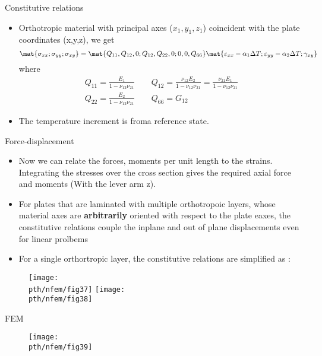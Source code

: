	\begin{frame}{Constitutive relations}
		\begin{itemize}
			\item Orthotropic material with principal axes ($x_1,y_1,z_1$) coincident with the plate coordinates (x,y,z), we get
			\begin{equation}
			\mat{\sigma_{xx};\sigma_{yy};\sigma_{xy}} = \mat{Q_{11},Q_{12},0;Q_{12},Q_{22},0;0,0,Q_{66}}
			\mat{\varepsilon_{xx} - \alpha_1\Delta T;\varepsilon_{yy} - \alpha_2\Delta T;\gamma_{xy}}
			\end{equation}
			where 
			\begin{equation}
			\begin{aligned}
			Q_{11} =  \frac{E_1}{1-\nu_{12}\nu_{21}} \qquad Q_{12} =  \frac{\nu_{12} E_2}{1-\nu_{12}\nu_{21}} = \frac{\nu_{21} E_1}{1-\nu_{12}\nu_{21}} \\
			Q_{22} = \frac{E_2}{1-\nu_{12}\nu_{21}} \qquad Q_{66} = G_{12}
			\end{aligned}
			\end{equation}
			\item The temperature increment is froma reference state.
		\end{itemize}
	\end{frame}


	\begin{frame}{Force-displacement}
		\begin{itemize}
			\item Now we can relate the forces, moments per unit length to the strains. Integrating the stresses over the cross section gives the required axial force and moments (With the lever arm z). 
			\item For plates that are laminated with multiple orthotropoic layers, whose material axes are \textbf{arbitrarily} oriented with respect to the plate eaxes, the constitutive relations couple the inplane and out of plane displacements even for linear prolbems
			\item For a single orthortropic layer, the constitutive relations are simplified as :
		\end{itemize}
		\begin{figure}
			\centering
			\texttt{[image: \\pth/nfem/fig37]}  	
			\texttt{[image: \\pth/nfem/fig38]}	
		\end{figure}
	\end{frame}


	\begin{frame}{FEM}
		\begin{figure}
			\centering
			\texttt{[image: \\pth/nfem/fig39]}  		
		\end{figure}
	\end{frame}


